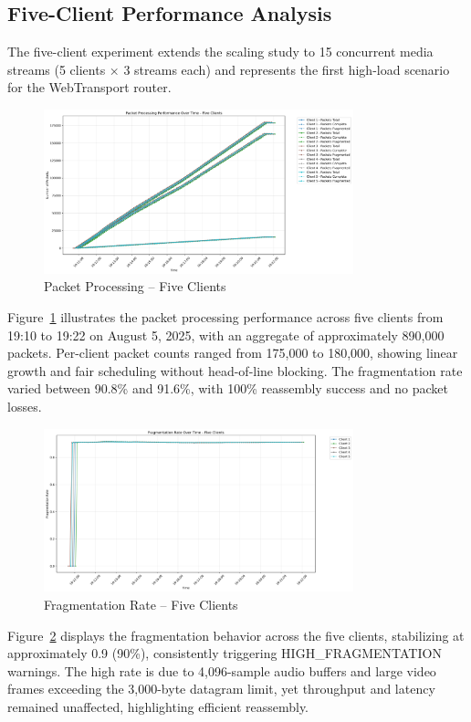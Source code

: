 \subsection{Five-Client Performance Analysis}
The five-client experiment extends the scaling study to 15 concurrent media streams (5 clients × 3 streams each) and represents the first high-load scenario for the WebTransport router.
\begin{figure}[h!]
\centering
\includegraphics[width=0.8\textwidth]{Evaluation/packet_processing_by_client_five-clients.png}
\caption{Packet Processing – Five Clients}
\label{fig:packet-processing-five-clients}
\end{figure}
Figure~\ref{fig:packet-processing-five-clients} illustrates the packet processing performance across five clients from 19:10 to 19:22 on August 5, 2025, with an aggregate of approximately 890,000 packets. Per-client packet counts ranged from 175,000 to 180,000, showing linear growth and fair scheduling without head-of-line blocking. The fragmentation rate varied between 90.8\% and 91.6\%, with 100\% reassembly success and no packet losses.
\begin{figure}[h!]
\centering
\includegraphics[width=0.8\textwidth]{Evaluation/fragmentation_by_client_five-clients.png}
\caption{Fragmentation Rate – Five Clients}
\label{fig:fragmentation-five-clients}
\end{figure}
Figure~\ref{fig:fragmentation-five-clients} displays the fragmentation behavior across the five clients, stabilizing at approximately 0.9 (90\%), consistently triggering HIGH\_FRAGMENTATION warnings. The high rate is due to 4,096-sample audio buffers and large video frames exceeding the 3,000-byte datagram limit, yet throughput and latency remained unaffected, highlighting efficient reassembly.
